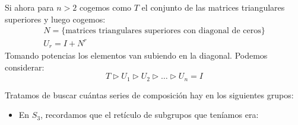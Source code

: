 \begin{ejemplo}
    \noindent
    Si ahora para $n>2$ cogemos como $T$ el conjunto de las matrices triangulares superiores y luego cogemos:
    \begin{gather*}
        N = \{\text{matrices triangulares superiores con diagonal de ceros}\} \\
        U_r = I + N^r
    \end{gather*}
    Tomando potencias los elementos van subiendo en la diagonal. Podemos considerar:
    \begin{equation*}
        T \rhd U_1 \rhd U_2 \rhd \ldots \rhd U_n = I
    \end{equation*}
\end{ejemplo}

\begin{ejemplo} %
    Tratamos de buscar cuántas series de composición hay en los siguientes grupos:
    \begin{itemize}
        \item En $S_3$, recordamos que el retículo de subgrupos que teníamos era:
            \begin{figure}[H]
                \centering
\end{figure}
\end{itemize}
\end{ejemplo}
